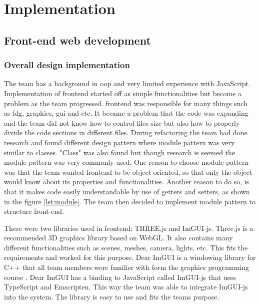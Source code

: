 \chapter{Implementation}
\label{chap:implementation}

\section{Front-end web development}
\subsection{Overall design implementation}
\label{subsection:frontendOverallDesignImplementation}



The team has a background in \gls{oop} and very limited experience with JavaScript. Implementation of \gls{frontend} started off as simple functionalities but become a problem as the team progressed. \Gls{frontend} was responsible for many things such as \gls{fdg}, graphics, \gls{gui} and etc. It became a problem that the code was expanding and the team did not know how to control files size but also how to properly divide the code sections in different files.
During refactoring the team had done research and found different design pattern where module pattern \cite{scotch:javascriptpatterns} was very similar to classes. "Class" was also found but though research is seemed the module pattern was very commonly used. One reason to choose module pattern was that the team wanted \gls{frontend} to be object-oriented, so that only the object would know about its properties and functionalities. Another reason to do so, is that it makes code easily understandable by use of getters and setters, as shown in the figure \ref{lst:module}.
The team then decided to implement module pattern to structure front-end. 

There were two libraries used in \gls{frontend}; THREE.js and ImGUI-js. Three.js is a recommended \cite{cmarix:threejs} 3D graphics library based on WebGL. It also contains many different functionalities such as scenes, meshes, camera, lights, etc. This fits the requirements and worked for this purpose. Dear ImGUI is a windowing library for C++ that all team members were familier with form the graphics programming course \cite{course:graphics}. Dear ImGUI has a binding to JavaScript called ImGUI-js that uses TypeScript and Emscripten. This way the team was able to integrate ImGUI-js into the system. The library is easy to use and fits the teams purpose.

